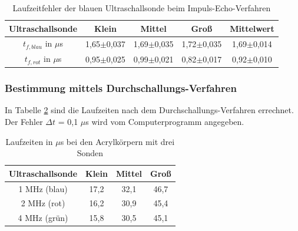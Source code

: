 \begin{table}[H]
 \begin{tabular}{c|c|c|c|c}
Ultraschallsonde & Klein & Mittel & Groß & Mittelwert\\
 \hline
  $t_{f,blau}$ in $\mu$s &1,65$\pm$0,037	&1,69$\pm$0,035	&1,72$\pm$0,035 & 1,69$\pm$0,014 \\
  $t_{f,rot}$ in $\mu$s &0,95$\pm$0,025	&0,99$\pm$0,021	&0,82$\pm$0,017 & 0,92$\pm$0,010
 \end{tabular}
\caption{Laufzeitfehler der blauen Ultraschallsonde beim Impuls-Echo-Verfahren}
\label{tab_laufzeitfehler}
\end{table}

\subsubsection{Bestimmung mittels Durchschallungs-Verfahren}
\label{sec_durchschall}
In Tabelle \ref{tab_durchschall} sind die Laufzeiten nach dem Durchschallungs-Verfahren errechnet. Der Fehler $\Delta t$ = 0,1 $\mu$s
wird vom Computerprogramm angegeben.

\begin{table}[H]
 \begin{tabular}{c|c|c|c}
 Ultraschallsonde & Klein & Mittel & Groß\\
 \hline
1 MHz (blau) & 17,2&	32,1&	46,7\\
2 MHz (rot) &16,2&	30,9&	45,4\\
4 MHz (grün) &15,8	&30,5&	45,1  
 \end{tabular}
\caption{Laufzeiten in $\mu$s bei den Acrylkörpern mit drei Sonden}
\label{tab_durchschall}
\end{table}


